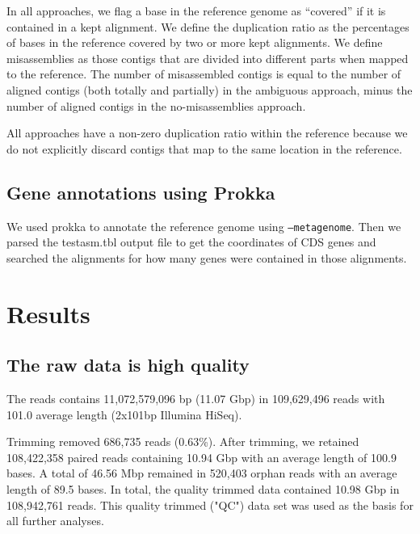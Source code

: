 \documentclass[10pt,a4paper,twocolumn]{article}
\begin{document}
In all approaches, we flag a base in the reference genome as
``covered'' if it is contained in a kept alignment.  We define the
duplication ratio as the percentages of bases in the reference covered
by two or more kept alignments. We define misassemblies as
those contigs that are divided into different parts when mapped to the
reference.  The number of misassembled contigs is equal to the number
of aligned contigs (both totally and partially) in the ambiguous
approach, minus the number of aligned contigs in the no-misassemblies
approach.


All approaches have a non-zero duplication ratio within the reference
because we do not explicitly discard contigs that map to the same
location in the reference.


\subsection*{Gene annotations using Prokka}
We used prokka \cite{prokka} to annotate the reference genome using
{\tt{--metagenome}}. Then we parsed
the testasm.tbl output file to get the coordinates of CDS genes and
searched the alignments for how many genes were contained in those
alignments.

\section*{Results}

\subsection*{The raw data is high quality}


The reads contains 11,072,579,096 bp (11.07 Gbp) in 109,629,496 reads
with 101.0 average length (2x101bp Illumina HiSeq).

Trimming removed 686,735 reads (0.63\%).  After trimming, we retained
108,422,358 paired reads containing 10.94 Gbp with an average length of
100.9 bases. A total of 46.56 Mbp remained in 520,403 orphan reads with
an average length of 89.5 bases. In total, the quality trimmed data
contained 10.98 Gbp in 108,942,761 reads.  This quality trimmed ("QC")
data set was used as the basis for all further analyses.
\end{document}
